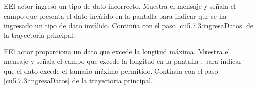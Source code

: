  \begin{UCtrayectoriaA}{E}{El actor ingresó un tipo de dato incorrecto.}
    \UCpaso[\UCsist] Muestra el mensaje  y señala el campo que presenta el dato inválido en la 
    pantalla  para indicar que se ha ingresado un tipo de dato inválido.
    \UCpaso[] Continúa con el paso \ref{cu5.7.3:ingresaDatos} de la trayectoria principal.
 \end{UCtrayectoriaA}
 \begin{UCtrayectoriaA}{F}{El actor proporciona un dato que excede la longitud máxima.}
    \UCpaso[\UCsist] Muestra el mensaje  y señala el campo que excede la 
    longitud en la pantalla , para indicar que el dato excede el tamaño máximo permitido.
    \UCpaso[] Continúa con el paso \ref{cu5.7.3:ingresaDatos} de la trayectoria principal.
 \end{UCtrayectoriaA}
 
 